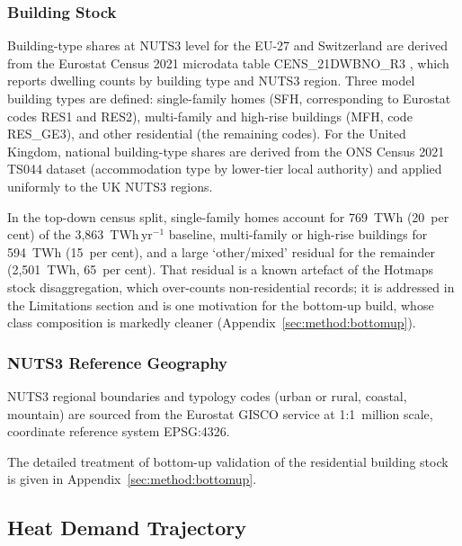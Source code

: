 \subsubsection{Building Stock}

Building-type shares at NUTS3 level for the EU-27 and Switzerland are derived from
the Eurostat Census 2021 microdata table CENS\_21DWBNO\_R3
\citep{Eurostat2021census}, which reports dwelling counts by building type and
NUTS3 region. Three model building types are defined: single-family homes (SFH,
corresponding to Eurostat codes RES1 and RES2), multi-family and high-rise
buildings (MFH, code RES\_GE3), and other residential (the remaining codes). For
the United Kingdom, national building-type shares are derived from the ONS Census
2021 TS044 dataset (accommodation type by lower-tier local authority)
\citep{ONS2021TS044} and applied uniformly to the UK NUTS3 regions.

In the top-down census split, single-family homes account for 769~TWh (20~per cent) of
the 3{,}863~TWh\,yr$^{-1}$ baseline, multi-family or high-rise buildings for
594~TWh (15~per cent), and a large `other/mixed' residual for the remainder
(2{,}501~TWh, 65~per cent). That
residual is a known artefact of the Hotmaps stock disaggregation, which
over-counts non-residential records; it is addressed in the Limitations section
and is one motivation for the bottom-up build, whose class composition is markedly
cleaner (Appendix~\ref{sec:method:bottomup}).

\subsubsection{NUTS3 Reference Geography}

NUTS3 regional boundaries and typology codes (urban or rural, coastal, mountain)
are sourced from the Eurostat GISCO service \citep{EurostatGISCO2021} at
1:1~million scale, coordinate reference system EPSG:4326.

\noindent The detailed treatment of bottom-up validation of the residential building stock is given in Appendix~\ref{sec:method:bottomup}.

\subsection{Heat Demand Trajectory}
\label{sec:method:demand}

